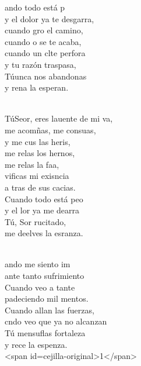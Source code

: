 \begin{cancion}%
	ando todo está p\\
y el dolor ya te desgarra,\\
	cuando gro el camino, \\
	cuando o se te acaba,\\
	cuando un clte perfora \\
	y tu razón traspasa,\\
	Túunca nos abandonas \\
	y rena la esperan.\\\jump\\
	\begin{chorus}%
	TúSeor, eres lauente de mi va, \\
	me acomñas, me consuas,\\
	y me cus las heris,\\
	me relas los hernos, \\
	me relas la faa,\\
	vificas mi exisncia\\
	a tras de sus cacias. \\
	Cuando todo está peo\\
	y el lor ya me dearra\\
	Tú, Sor rucitado, \\
	me deelves la esranza.\\
	\end{chorus}%
	\jump\\
	ando me siento im\\
ante tanto sufrimiento\\
	Cuando veo a tante\\
	padeciendo mil mentos.\\
	Cuando allan las fuerzas,\\
	cndo veo que ya no alcanzan\\
	Tú mensuflas fortaleza \\
	y rece la espenza.\\
<span id=cejilla-original>1</span>\\
\end{cancion}%
